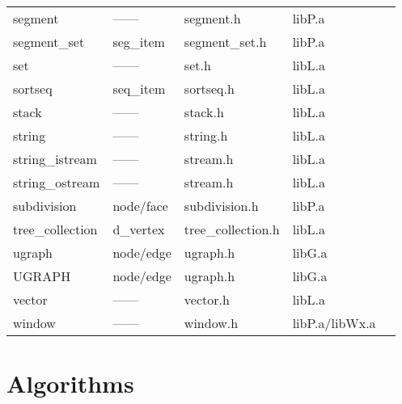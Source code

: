 \begin{tabular}{lllll}
segment             &------          &segment.h         &libP.a         &\pageref{Segments}\\
segment\_set        &seg\_item       &segment\_set.h    &libP.a         &\pageref{Sets of Parallel Segments}\\
set                 &------          &set.h             &libL.a         &\pageref{Sets}\\
sortseq             &seq\_item       &sortseq.h         &libL.a         &\pageref{Sorted Sequences}\\
stack               &------          &stack.h           &libL.a         &\pageref{Stacks}\\
string              &------          &string.h          &libL.a         &\pageref{Strings}\\
string\_istream     &------          &stream.h          &libL.a         &\pageref{String Input Streams}\\
string\_ostream     &------          &stream.h          &libL.a         &\pageref{String Output Streams}\\
subdivision         &node/face       &subdivision.h     &libP.a         &\pageref{Planar Subdivisions}\\
tree\_collection    &d\_vertex       &tree\_collection.h&libL.a         &\pageref{Dynamic Collections of Trees}\\
ugraph              &node/edge       &ugraph.h          &libG.a         &\pageref{Undirected Graphs}\\
UGRAPH              &node/edge       &ugraph.h          &libG.a         &\pageref{Parameterized Ugraphs}\\
vector              &------          &vector.h          &libL.a         &\pageref{Real-Valued Vectors}\\
window              &------          &window.h          &libP.a/libWx.a &\pageref{Graphic Windows}\\
\end{tabular}


\newpage

\section{Algorithms}  \label{Table Algorithms}


